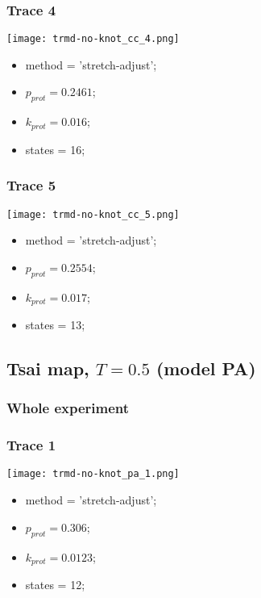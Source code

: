\begin{minipage}[c]{0.45\textwidth}
\subsubsection{Trace 4}
\begin{minipage}[c]{0.7\textwidth}
    \texttt{[image: trmd-no-knot\_cc\_4.png]}
\end{minipage}
\hfill
\begin{minipage}[c]{0.45\textwidth}
    \begin{itemize}
        \item method = 'stretch-adjust';
        \item $p_{prot}=0.2461$;
        \item $k_{prot}=0.016$;
        \item states = 16;
    \end{itemize}
\end{minipage}

\subsubsection{Trace 5}
\begin{minipage}[c]{0.7\textwidth}
    \texttt{[image: trmd-no-knot\_cc\_5.png]}
\end{minipage}
\hfill
\begin{minipage}[c]{0.45\textwidth}
    \begin{itemize}
        \item method = 'stretch-adjust';
        \item $p_{prot}=0.2554$;
        \item $k_{prot}=0.017$;
        \item states = 13;
    \end{itemize}
\end{minipage}

\subsection{Tsai map, $T=0.5$ (model PA)}
\subsubsection{Whole experiment}

\subsubsection{Trace 1}
\begin{minipage}[c]{0.7\textwidth}
    \texttt{[image: trmd-no-knot\_pa\_1.png]}
\end{minipage}
\hfill
\begin{minipage}[c]{0.45\textwidth}
    \begin{itemize}
        \item method = 'stretch-adjust';
        \item $p_{prot}=0.306$;
        \item $k_{prot}=0.0123$;
        \item states = 12;
    \end{itemize}
\end{minipage}


\end{minipage}
